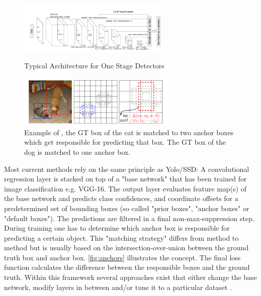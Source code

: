 \documentclass{article}
\begin{document}
\begin{figure}[h]
	\centering
	\begin{minipage}{0.4\textwidth}
		\centering
		\includegraphics[height=2.5cm]{fig/architecture}
		\caption{Typical Architecture for One Stage Detectors}
		\label{fig:architecture}
	\end{minipage}
	\hspace{2cm}
	\begin{minipage}{0.4\textwidth}
		\centering
		\includegraphics[height=2.5cm]{fig/anchors}
		\caption{Example of \cite{Liu}, the GT box of the cat is matched to two anchor boxes which get responsible for predicting that box. The GT box of the dog is matched to one anchor box.}
		\label{fig:anchors}
	\end{minipage}
\end{figure}

Most current methods rely on the same principle as Yolo/SSD: A convolutional regression layer is stacked on top of a "base network" that has been trained for image classification e.g. VGG-16. The output layer evaluates feature map(s) of the base network and predicts class confidences, and coordinate offsets for a predetermined set of bounding boxes (so called "prior boxes", "anchor boxes" or "default boxes"). The predictions are filtered in a final non-max-suppression step. During training one has to determine which anchor box is responsible for predicting a certain object. This "matching strategy" differs from method to method but is usually based on the intersection-over-union between the ground truth box and anchor box. \autoref{fig:anchors} illustrates the concept. The final loss function calculates the difference between the responsible boxes and the ground truth. Within this framework several approaches exist that either change the base network, modify layers in between and/or tune it to a particular dataset \cite{ChengchengNing2017,Wu,Xiang,Linb,TripathiSanDiego,YoungwanLee}.
\end{document}
